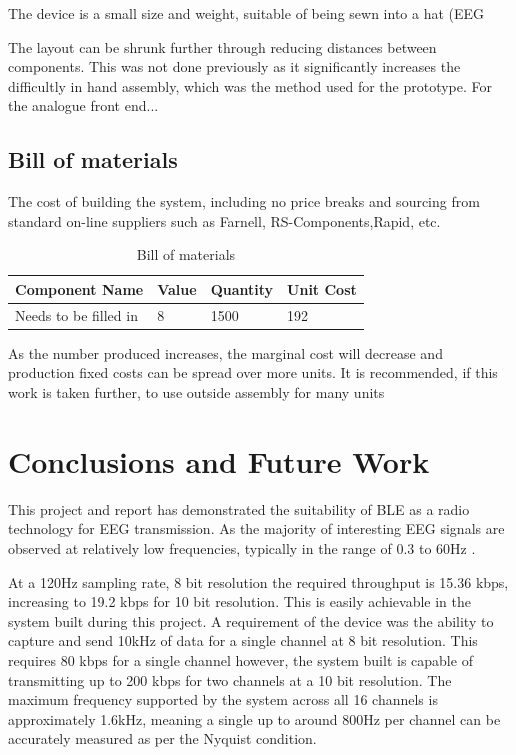 \documentclass[]{article}
\begin{document}
The device is a small size and weight, suitable of being sewn into a hat (EEG

The layout can be shrunk further through reducing distances between components. This was not done previously as it significantly increases the difficultly in hand assembly, which was the method used for the prototype. For the analogue front end...


\subsection{Bill of materials}

The cost of building the system, including no price breaks and sourcing from standard on-line suppliers such as Farnell, RS-Components,Rapid, etc.

\begin{table}[H]
\centering
\caption{Bill of materials}
\label{fig:sensors}
\begin{tabular}{|p{1.1in}|p{1.1in}|p{1.1in}|p{1.1in}|} \hline 
\textbf{Component Name} & \textbf{Value} & \textbf{Quantity} & \textbf{Unit Cost} \\ \hline 
Needs to be filled in & 8 & 1500 & 192 \\ \hline  



\end{tabular}
\end{table}

As the number produced increases, the marginal cost will decrease and production fixed costs can be spread over more units. It is recommended, if this work is taken further, to use outside assembly for many units

\clearpage 
\section{Conclusions and Future Work}

This project and report has demonstrated the suitability of \ac{BLE} as a radio technology for \ac{EEG} transmission. As the majority of interesting \ac{EEG} signals are observed at relatively low frequencies, typically in the range of 0.3 to 60Hz \cite{eeeman}.

 At a 120Hz sampling rate, 8 bit resolution the required throughput is 15.36 kbps, increasing to 19.2 kbps for 10 bit resolution. This is easily achievable in the system built during this project. A requirement of the device was the ability to capture and send 10kHz of data for a single channel at 8 bit resolution. This requires 80 kbps for a single channel however, the system built is capable of transmitting up to 200 kbps for two channels at a 10 bit resolution. The maximum frequency supported by the system across all 16 channels is approximately 1.6kHz, meaning a single up to around 800Hz per channel can be accurately measured as per the Nyquist condition. 
\end{document}
